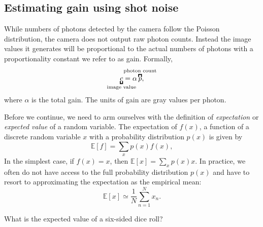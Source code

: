 \documentclass[a4paper]{report}
\newcommand{\nexercise}[0]{\arabic{exercises}\addtocounter{exercises}{1}}
\begin{document}
\subsection{Estimating gain using shot noise}
While numbers of photons detected by the camera follow the Poisson distribution, the camera does not output raw photon counts.
Instead the image values it generates will be proportional to the actual numbers of photons with a proportionality constant we refer to as gain.
Formally,
\begin{equation}
	\underbracket{c}_{\mathclap{\text{image value}}} = \alpha \overbracket{p}^{\mathclap{\text{photon count}}},
\end{equation} 
where $\alpha$ is the total gain.
The units of gain are gray values per photon. 

Before we continue, we need to arm ourselves with the definition of \textit{expectation} or \textit{expected value} of a random variable. 
The expectation of $f(x)$, a function of a discrete random variable $x$ with a probability distribution $p(x)$ is given by
\begin{equation}
\mathbb {E} [f] = \sum _{x} p(x) f(x),
\end{equation}
In the simplest case, if $f(x) = x$, then $\mathbb {E} [x] = \sum _{x} p(x) x$. 
In practice, we often do not have access to the full probability distribution $p(x)$ and have to resort to approximating the expectation as the empirical mean:
\begin{equation}
\mathbb { E } [ x ] \simeq \frac { 1 } { N } \sum _ { n = 1 } ^ { N } x _{n}.
\end{equation}

\begin{exercisebox}[frametitle={Exercise \nexercise: Expectation example}]
What is the expected value of a six-sided dice roll? 
\end{exercisebox}
\end{document}
